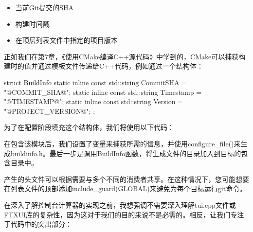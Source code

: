 \begin{itemize}
\item
当前Git提交的SHA

\item
构建时间戳

\item
在顶层列表文件中指定的项目版本
\end{itemize}

正如我们在第7章，《使用CMake编译C++源代码》中学到的，CMake可以捕获构建时的值并通过模板文件传递给C++代码，例如通过一个结构体：


\begin{cpp}
struct BuildInfo {
    static inline const std::string CommitSHA = "@COMMIT_SHA@";
    static inline const std::string Timestamp = "@TIMESTAMP@";
    static inline const std::string Version = "@PROJECT_VERSION@";
};
\end{cpp}

为了在配置阶段填充这个结构体，我们将使用以下代码：



在包含该模块后，我们设置了变量来捕获所需的信息，并使用configure\_file()来生成buildinfo.h。最后一步是调用BuildInfo函数，将生成文件的目录加入到目标的包含目录中。

产生的头文件可以根据需要与多个不同的消费者共享。在这种情况下，您可能想要在列表文件的顶部添加include\_guard(GLOBAL)来避免为每个目标运行git命令。

在深入了解控制台计算器的实现之前，我想强调不需要深入理解tui.cpp文件或FTXUI库的复杂性，因为这对于我们的目的来说不是必需的。相反，让我们专注于代码中的突出部分：


